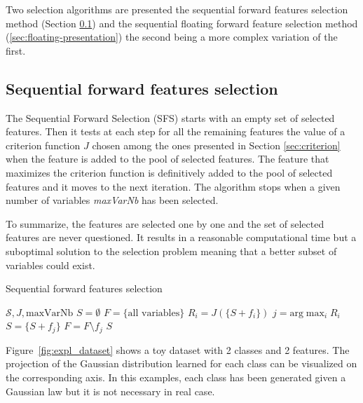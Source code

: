 \documentclass[a4paper,11pt,DIV=16]{scrartcl}
\begin{document}
Two selection algorithms are presented the sequential forward features selection method (Section \ref{sec:forward-presentation}) and the sequential floating forward feature selection method (\ref{sec:floating-presentation}) the second being a more complex variation of the first.

    \subsection{Sequential forward features selection}
    \label{sec:forward-presentation}

    The Sequential Forward Selection (SFS) starts with an empty set of selected features. Then it tests at each step for all the remaining features the value of a criterion function $J$ chosen among the ones presented in Section \ref{sec:criterion} when the feature is added to the pool of selected features. The feature that maximizes the criterion function is definitively added to the pool of selected features and it moves to the next iteration. The algorithm stops when a given number of variables \emph{maxVarNb} has been selected.

    To summarize, the features are selected one by one and the set of selected features are never questioned. It results in a reasonable computational time but a suboptimal solution to the selection problem meaning that a better subset of variables could exist.

    \begin{algorithm}
    \caption{Sequential forward features selection\label{alg:sfs}}
    {\fontsize{10}{10}\selectfont
    \begin{algorithmic}[1]
    \REQUIRE $\mathcal{S},J,\text{maxVarNb}$
    \STATE $S=\emptyset$
    \STATE $F=\text{\{all variables\}}$
    \STATE $R_i = J(\{S + f_i\})$
    \ENDFOR
    \STATE $j=\text{arg} \max_{i} R_i$
    \STATE $S = \{S + f_j\}$
    \STATE $F = F \setminus f_j$
    \ENDWHILE
    \RETURN $S$
    \end{algorithmic}
    }
    \end{algorithm}


    Figure~\ref{fig:expl_dataset} shows a toy dataset with 2 classes and 2 features. The projection of the Gaussian distribution learned for each class can be visualized on the corresponding axis. In this examples, each class has been generated given a Gaussian law but it is not necessary in real case.
\end{document}
